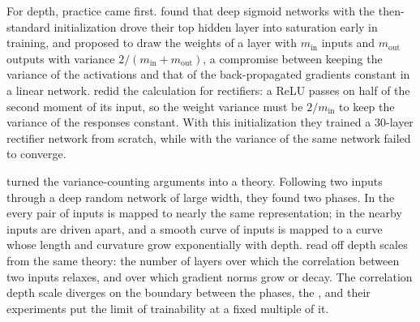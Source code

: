 \begin{refsection}
For depth, practice came first. \Textcite{GlorotBengio2010} found that deep sigmoid networks with the then-standard initialization drove their top hidden layer into saturation early in training, and proposed to draw the weights of a layer with $m_{\mathrm{in}}$ inputs and $m_{\mathrm{out}}$ outputs with variance $2/(m_{\mathrm{in}}+m_{\mathrm{out}})$, a compromise between keeping the variance of the activations and that of the back-propagated gradients constant in a linear network. \Textcite{HeEtAl2015} redid the calculation for rectifiers: a ReLU passes on half of the second moment of its input, so the weight variance must be $2/m_{\mathrm{in}}$ to keep the variance of the responses constant. With this initialization they trained a $30$-layer rectifier network from scratch, while with the variance of \textcite{GlorotBengio2010} the same network failed to converge.

\Textcite{PooleEtAl2016} turned the variance-counting arguments into a theory. Following two inputs through a deep random network of large width, they found two phases. In the  every pair of inputs is mapped to nearly the same representation; in the  nearby inputs are driven apart, and a smooth curve of inputs is mapped to a curve whose length and curvature grow exponentially with depth. \Textcite{SchoenholzEtAl2017} read off depth scales from the same theory: the number of layers over which the correlation between two inputs relaxes, and over which gradient norms grow or decay. The correlation depth scale diverges on the boundary between the phases, the , and their experiments put the limit of trainability at a fixed multiple of it.



\end{refsection}
